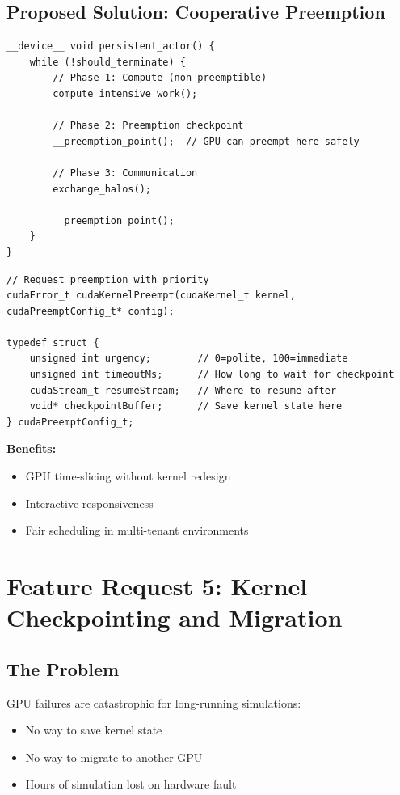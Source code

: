 \documentclass[11pt,a4paper]{article}
\newenvironment{benefitsbox}{%
    \vspace{6pt}%
    \noindent\textbf{Benefits:}%
    \begin{itemize}[leftmargin=1.5em,topsep=2pt,itemsep=1pt]%
}{%
    \end{itemize}%
    \vspace{6pt}%
}
\begin{document}
\subsection{Proposed Solution: Cooperative Preemption}

\begin{lstlisting}[style=cstyle,title={Mark preemption-safe points in kernel}]
__device__ void persistent_actor() {
    while (!should_terminate) {
        // Phase 1: Compute (non-preemptible)
        compute_intensive_work();

        // Phase 2: Preemption checkpoint
        __preemption_point();  // GPU can preempt here safely

        // Phase 3: Communication
        exchange_halos();

        __preemption_point();
    }
}
\end{lstlisting}

\begin{lstlisting}[style=cstyle,title={Host-side control}]
// Request preemption with priority
cudaError_t cudaKernelPreempt(cudaKernel_t kernel, cudaPreemptConfig_t* config);

typedef struct {
    unsigned int urgency;        // 0=polite, 100=immediate
    unsigned int timeoutMs;      // How long to wait for checkpoint
    cudaStream_t resumeStream;   // Where to resume after
    void* checkpointBuffer;      // Save kernel state here
} cudaPreemptConfig_t;
\end{lstlisting}

\begin{benefitsbox}
    \item GPU time-slicing without kernel redesign
    \item Interactive responsiveness
    \item Fair scheduling in multi-tenant environments
\end{benefitsbox}

\newpage

\section{Feature Request 5: Kernel Checkpointing and Migration}

\subsection{The Problem}

GPU failures are catastrophic for long-running simulations:
\begin{itemize}[leftmargin=*]
    \item No way to save kernel state
    \item No way to migrate to another GPU
    \item Hours of simulation lost on hardware fault
\end{itemize}
\end{document}
